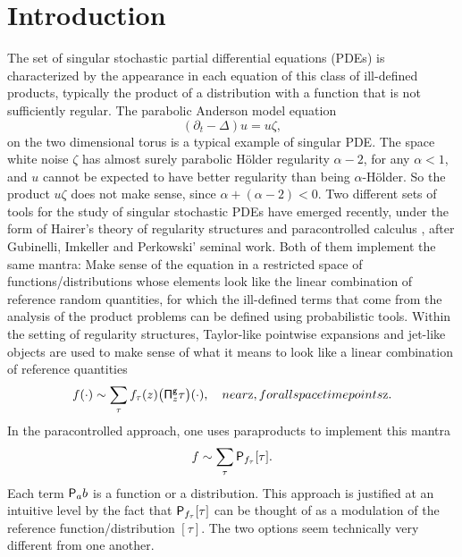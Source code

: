 \documentclass[11pt]{article}
\numberwithin{equation}{section}
\theoremstyle{plain}
\theoremstyle{definition}
\begin{document}
\section{Introduction}
\label{SectionIntro}

The set of singular stochastic partial differential equations (PDEs) is characterized by the appearance in each equation of this class of ill-defined products, typically the product of a distribution with a function that is not sufficiently regular. The parabolic Anderson model equation
\[
(\partial_t-\Delta) u = u\zeta,
\]
on the two dimensional torus is a typical example of singular PDE. The space white noise $\zeta$ has almost surely parabolic Hölder regularity $\alpha-2$, for any $\alpha<1$, and $u$ cannot be expected to have better regularity than being $\alpha$-Hölder. So the product $u\zeta$ does not make sense, since $\alpha+(\alpha-2)<0$. Two different sets of tools for the study of singular stochastic PDEs have emerged recently, under the form of Hairer's theory of regularity structures \cite{Hai, BHZ, CH16, BCCH18} and paracontrolled calculus \cite{GIP, BBF15, BB16}, after Gubinelli, Imkeller and Perkowski' seminal work. Both of them implement the same mantra: Make sense of the equation in a restricted space of functions/distributions whose elements look like the linear combination of reference random quantities, for which the ill-defined terms that come from the analysis of the product problems can be defined using probabilistic tools. Within the setting of regularity structures, Taylor-like pointwise expansions and jet-like objects are used to make sense of what it means to look like a linear combination of reference quantities
\[
f (\cdot) \sim \sum_\tau f_\tau(z)\bigl({\sf \Pi}^{\sf g}_z\tau\bigr)(\cdot), \quad \textrm{near $z$, for all spacetime points $z$}.
\]
In the paracontrolled approach, one uses paraproducts to implement this mantra
\[
f \sim \sum_\tau {\sf P}_{f_\tau}[\tau].
\]
Each term ${\sf P}_ab$ is a function or a distribution. This approach is justified at an intuitive level by the fact that ${\sf P}_{f_\tau}[\tau]$ can be thought of as a modulation of the reference function/distribution $[\tau]$. The two options seem technically very different from one another.
\end{document}

